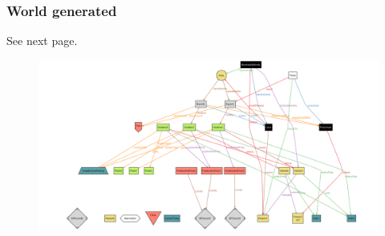 \subsubsection{World generated}
See next page.
\newpage
\begin{figure}[h]
	\includegraphics[angle=90, scale=0.45, height=\textheight]{Images/world}
\end{figure}